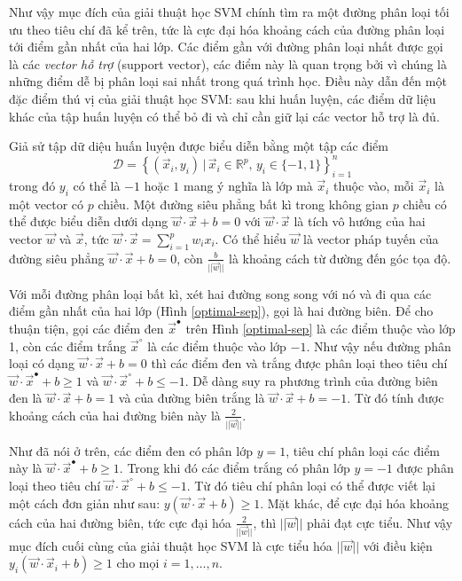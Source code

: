 Như vậy mục đích của giải thuật học SVM chính tìm ra một đường phân loại tối ưu theo tiêu chí đã kể trên, tức là cực đại hóa khoảng cách của đường phân loại tới điểm gần nhất của hai lớp. Các điểm gần với đường phân loại nhất được gọi là các \emph{vector hỗ trợ} (support vector), các điểm này là quan trọng bởi vì chúng là những điểm dễ bị phân loại sai nhất trong quá trình học. Điều này dẫn đến một đặc điểm thú vị của giải thuật học SVM: sau khi huấn luyện, các điểm dữ liệu khác của tập huấn luyện có thể bỏ đi và chỉ cần giữ lại các vector hỗ trợ là đủ.

Giả sử tập dữ diệu huấn luyện được biểu diễn bằng một tập các điểm \[\mathcal{D}=\left\{(\vec{x}_i,y_i)\,|\,\vec{x}_i\in\mathbb{R}^p,\,y_i\in\{-1,1\}\right\}_{i=1}^{n}\] trong đó $y_i$ có thể là $-1$ hoặc $1$ mang ý nghĩa là lớp mà $\vec{x}_i$ thuộc vào, mỗi $\vec{x}_i$ là một vector có $p$ chiều. Một đường siêu phẳng bất kì trong không gian $p$ chiều có thể được biểu diễn dưới dạng $\vec{w}\cdot\vec{x}+b=0$ với $\vec{w}\cdot\vec{x}$ là tích vô hướng của hai vector $\vec{w}$ và $\vec{x}$, tức $\vec{w}\cdot\vec{x}=\sum_{i=1}^{p}w_ix_i$. Có thể hiểu $\vec{w}$ là vector pháp tuyến của đường siêu phẳng $\vec{w}\cdot\vec{x}+b=0$, còn $\frac{b}{||\vec{w}||}$ là khoảng cách từ đường đến góc tọa độ.

Với mỗi đường phân loại bất kì, xét hai đường song song với nó và đi qua các điểm gần nhất của hai lớp (Hình \ref{optimal-sep}), gọi là hai đường biên. Để cho thuận tiện, gọi các điểm đen $\vec{x}^\bullet$ trên Hình \ref{optimal-sep} là các điểm thuộc vào lớp 1, còn các điểm trắng $\vec{x}^\circ$ là các điểm thuộc vào lớp $-1$. Như vậy nếu đường phân loại có dạng $\vec{w}\cdot\vec{x}+b=0$ thì các điểm đen và trắng được phân loại theo tiêu chí $\vec{w}\cdot\vec{x}^\bullet+b\geq1$ và $\vec{w}\cdot\vec{x}^\circ+b\leq-1$. Dễ dàng suy ra phương trình của đường biên đen là $\vec{w}\cdot\vec{x}+b=1$ và của đường biên trắng là $\vec{w}\cdot\vec{x}+b=-1$. Từ đó tính được khoảng cách của hai đường biên này là $\frac{2}{||\vec{w}||}$.

Như đã nói ở trên, các điểm đen có phân lớp $y=1$, tiêu chí phân loại các điểm này là $\vec{w}\cdot\vec{x}^\bullet+b\geq1$. Trong khi đó các điểm trắng có phân lớp $y=-1$ được phân loại theo tiêu chí $\vec{w}\cdot\vec{x}^\circ+b\leq-1$. Từ đó tiêu chí phân loại có thể được viết lại một cách đơn giản như sau: $y(\vec{w}\cdot\vec{x}+b)\geq1$. Mặt khác, để cực đại hóa khoảng cách của hai đường biên, tức cực đại hóa $\frac{2}{||\vec{w}||}$, thì $||\vec{w}||$ phải đạt cực tiểu. Như vậy mục đích cuối cùng của giải thuật học SVM là cực tiểu hóa $||\vec{w}||$ với điều kiện $y_i(\vec{w}\cdot\vec{x}_i+b)\geq1$ cho mọi $i=1,\dots,n$.

